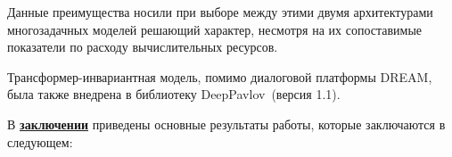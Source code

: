Данные преимущества носили при выборе между этими двумя архитектурами многозадачных моделей решающий характер, несмотря на их сопоставимые показатели по расходу вычислительных ресурсов.

Трансформер-инвариантная модель, помимо диалоговой платформы DREAM, была также внедрена в библиотеку DeepPavlov~\cite{dp_2023}(версия 1.1).


В \underline{\textbf{заключении}} приведены основные результаты работы, которые заключаются в следующем:


